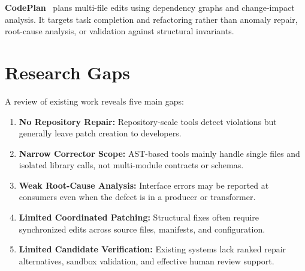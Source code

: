 \documentclass[10pt,a4paper]{article}
\begin{document}
\textbf{CodePlan}~\cite{codeplan} plans multi-file edits using dependency graphs and change-impact analysis. It targets task completion and refactoring rather than anomaly repair, root-cause analysis, or validation against structural invariants.

\section{Research Gaps}
A review of existing work reveals five main gaps:
\begin{enumerate}[leftmargin=1.4em]
  \item \textbf{No Repository Repair:} Repository-scale tools detect violations but generally leave patch creation to developers.
  \item \textbf{Narrow Corrector Scope:} AST-based tools mainly handle single files and isolated library calls, not multi-module contracts or schemas.
  \item \textbf{Weak Root-Cause Analysis:} Interface errors may be reported at consumers even when the defect is in a producer or transformer.
  \item \textbf{Limited Coordinated Patching:} Structural fixes often require synchronized edits across source files, manifests, and configuration.
  \item \textbf{Limited Candidate Verification:} Existing systems lack ranked repair alternatives, sandbox validation, and effective human review support.
\end{enumerate}
\end{document}
